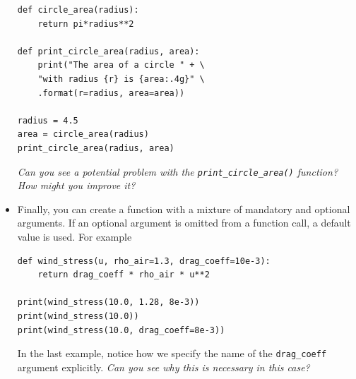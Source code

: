\documentclass[a4paper,twoside,titlepage]{memoir}
\newcommand{\shellcmd}{\texttt}
\begin{document}
\begin{itemize}
\begin{verbatim}
def circle_area(radius):
	return pi*radius**2

def print_circle_area(radius, area):
	print("The area of a circle " + \
	"with radius {r} is {area:.4g}" \
	.format(r=radius, area=area))

radius = 4.5
area = circle_area(radius)
print_circle_area(radius, area)
\end{verbatim}
\textit{Can you see a potential problem with the \texttt{print\_circle\_area()} function?  How might you improve it?}
\item Finally, you can create a function with a mixture of mandatory and optional arguments.  If an optional argument is omitted from a function call, a default value is used.  For example
\begin{verbatim}
def wind_stress(u, rho_air=1.3, drag_coeff=10e-3):
	return drag_coeff * rho_air * u**2

print(wind_stress(10.0, 1.28, 8e-3))
print(wind_stress(10.0))
print(wind_stress(10.0, drag_coeff=8e-3))
\end{verbatim}
\label{wind-stress}
In the last example, notice how we specify the name of the \shellcmd{drag\_coeff} argument explicitly.  \textit{Can you see why this is necessary in this case?}
\end{itemize}
\end{document}
